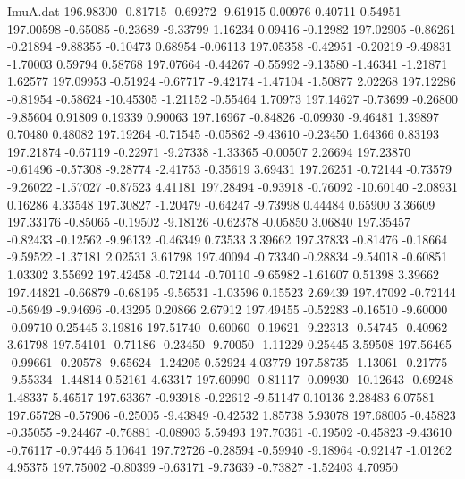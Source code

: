 \begin{filecontents}{ImuA.dat}
 196.98300   -0.81715   -0.69272   -9.61915    0.00976    0.40711    0.54951
 197.00598   -0.65085   -0.23689   -9.33799    1.16234    0.09416   -0.12982
 197.02905   -0.86261   -0.21894   -9.88355   -0.10473    0.68954   -0.06113
 197.05358   -0.42951   -0.20219   -9.49831   -1.70003    0.59794    0.58768
 197.07664   -0.44267   -0.55992   -9.13580   -1.46341   -1.21871    1.62577
 197.09953   -0.51924   -0.67717   -9.42174   -1.47104   -1.50877    2.02268
 197.12286   -0.81954   -0.58624  -10.45305   -1.21152   -0.55464    1.70973
 197.14627   -0.73699   -0.26800   -9.85604    0.91809    0.19339    0.90063
 197.16967   -0.84826   -0.09930   -9.46481    1.39897    0.70480    0.48082
 197.19264   -0.71545   -0.05862   -9.43610   -0.23450    1.64366    0.83193
 197.21874   -0.67119   -0.22971   -9.27338   -1.33365   -0.00507    2.26694
 197.23870   -0.61496   -0.57308   -9.28774   -2.41753   -0.35619    3.69431
 197.26251   -0.72144   -0.73579   -9.26022   -1.57027   -0.87523    4.41181
 197.28494   -0.93918   -0.76092  -10.60140   -2.08931    0.16286    4.33548
 197.30827   -1.20479   -0.64247   -9.73998    0.44484    0.65900    3.36609
 197.33176   -0.85065   -0.19502   -9.18126   -0.62378   -0.05850    3.06840
 197.35457   -0.82433   -0.12562   -9.96132   -0.46349    0.73533    3.39662
 197.37833   -0.81476   -0.18664   -9.59522   -1.37181    2.02531    3.61798
 197.40094   -0.73340   -0.28834   -9.54018   -0.60851    1.03302    3.55692
 197.42458   -0.72144   -0.70110   -9.65982   -1.61607    0.51398    3.39662
 197.44821   -0.66879   -0.68195   -9.56531   -1.03596    0.15523    2.69439
 197.47092   -0.72144   -0.56949   -9.94696   -0.43295    0.20866    2.67912
 197.49455   -0.52283   -0.16510   -9.60000   -0.09710    0.25445    3.19816
 197.51740   -0.60060   -0.19621   -9.22313   -0.54745   -0.40962    3.61798
 197.54101   -0.71186   -0.23450   -9.70050   -1.11229    0.25445    3.59508
 197.56465   -0.99661   -0.20578   -9.65624   -1.24205    0.52924    4.03779
 197.58735   -1.13061   -0.21775   -9.55334   -1.44814    0.52161    4.63317
 197.60990   -0.81117   -0.09930  -10.12643   -0.69248    1.48337    5.46517
 197.63367   -0.93918   -0.22612   -9.51147    0.10136    2.28483    6.07581
 197.65728   -0.57906   -0.25005   -9.43849   -0.42532    1.85738    5.93078
 197.68005   -0.45823   -0.35055   -9.24467   -0.76881   -0.08903    5.59493
 197.70361   -0.19502   -0.45823   -9.43610   -0.76117   -0.97446    5.10641
 197.72726   -0.28594   -0.59940   -9.18964   -0.92147   -1.01262    4.95375
 197.75002   -0.80399   -0.63171   -9.73639   -0.73827   -1.52403    4.70950

\end{filecontents}
